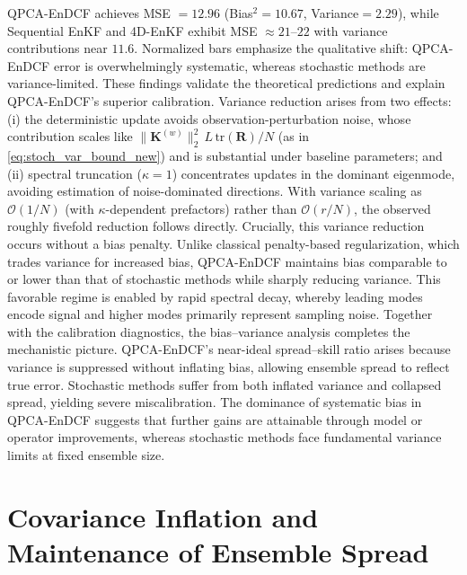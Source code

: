\documentclass[11pt,a4paper]{article}
\begin{document}
QPCA-EnDCF achieves MSE $=12.96$ (Bias$^2=10.67$, Variance$=2.29$), while Sequential EnKF and 4D-EnKF exhibit MSE $\approx21$--$22$ with variance contributions near $11.6$. Normalized bars emphasize the qualitative shift: QPCA-EnDCF error is overwhelmingly systematic, whereas stochastic methods are variance-limited.  These findings validate the theoretical predictions and explain QPCA-EnDCF’s superior calibration. Variance reduction arises from two effects: (i) the deterministic update avoids observation-perturbation noise, whose contribution scales like $\|\mathbf{K}^{(w)}\|_2^2\,L\,\mathrm{tr}(\mathbf{R})/N$ (as in \eqref{eq:stoch_var_bound_new}) and is substantial under baseline parameters; and (ii) spectral truncation ($\kappa=1$) concentrates updates in the dominant eigenmode, avoiding estimation of noise-dominated directions. With variance scaling as $\mathcal{O}(1/N)$ (with $\kappa$-dependent prefactors) rather than $\mathcal{O}(r/N)$, the observed roughly fivefold reduction follows directly. Crucially, this variance reduction occurs without a bias penalty. Unlike classical penalty-based regularization, which trades variance for increased bias, QPCA-EnDCF maintains bias comparable to or lower than that of stochastic methods while sharply reducing variance. This favorable regime is enabled by rapid spectral decay, whereby leading modes encode signal and higher modes primarily represent sampling noise. Together with the calibration diagnostics, the bias--variance analysis completes the mechanistic picture. QPCA-EnDCF’s near-ideal spread--skill ratio arises because variance is suppressed without inflating bias, allowing ensemble spread to reflect true error. Stochastic methods suffer from both inflated variance and collapsed spread, yielding severe miscalibration. The dominance of systematic bias in QPCA-EnDCF suggests that further gains are attainable through model or operator improvements, whereas stochastic methods face fundamental variance limits at fixed ensemble size.
\FloatBarrier





\section{Covariance Inflation and Maintenance of Ensemble Spread}
\label{sec:inflation}
\end{document}
